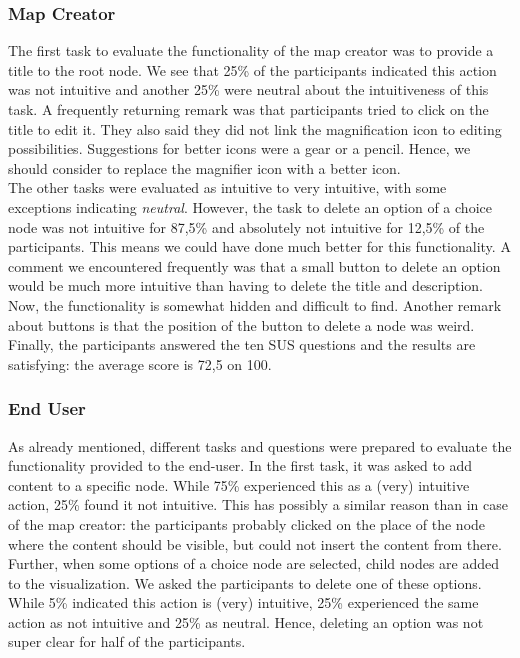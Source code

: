 \subsubsection{Map Creator}
The first task to evaluate the functionality of the map creator was to provide a title to the root node. We see that 25\% of the participants indicated this action was not intuitive and another 25\% were neutral about the intuitiveness of this task. A frequently returning remark was that participants tried to click on the title to edit it. They also said they did not link the magnification icon to editing possibilities. Suggestions for better icons were a gear or a pencil. Hence, we should consider to replace the magnifier icon with a better icon.\\

The other tasks were evaluated as intuitive to very intuitive, with some exceptions indicating \textit{neutral}. However, the task to delete an option of a choice node was not intuitive for 87,5\% and absolutely not intuitive for 12,5\% of the participants. This means we could have done much better for this functionality. A comment we encountered frequently was that a small button to delete an option would be much more intuitive than having to delete the title and description. Now, the functionality is somewhat hidden and difficult to find. Another remark about buttons is that the position of the button to delete a node was weird.\\

Finally, the participants answered the ten SUS questions and the results are satisfying: the average score is 72,5 on 100. 

\subsubsection{End User}
As already mentioned, different tasks and questions were prepared to evaluate the functionality provided to the end-user. In the first task, it was asked to add content to a specific node. While 75\% experienced this as a (very) intuitive action, 25\% found it not intuitive. This has possibly a similar reason than in case of the map creator: the participants probably clicked on the place of the node where the content should be visible, but could not insert the content from there.\\

Further, when some options of a choice node are selected, child nodes are added to the visualization. We asked the participants to delete one of these options. While 5\% indicated this action is (very) intuitive, 25\% experienced the same action as not intuitive and 25\% as neutral. Hence, deleting an option was not super clear for half of the participants.\\

